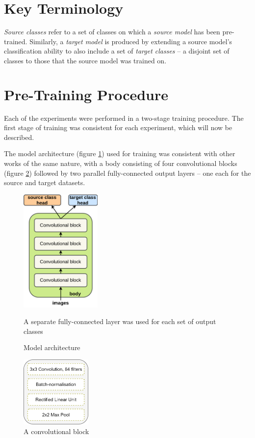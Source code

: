 \documentclass{report}
\begin{document}
	\section{Key Terminology}
	\textit{Source classes} refer to a set of classes on which a \textit{source model} has been pre-trained. Similarly, a \textit{target model} is produced by extending a source model's classification ability to also include a set of \textit{target classes} -- a disjoint set of classes to those that the source model was trained on. \par
	
	\section{Pre-Training Procedure} \label{pretrain}
	Each of the experiments were performed in a two-stage training procedure. The first stage of training was consistent for each experiment, which will now be described. \par
	The model architecture (figure \ref{fig:model:1}) used for training was consistent with other works of the same nature, with a body consisting of four convolutional blocks (figure \ref{fig:convblock:1}) followed by two parallel fully-connected output layers -- one each for the source and target datasets. \par
	\begin{figure}[h]
		\centering
		\includegraphics[width=4cm]{modelarchitecture}
		\caption{Model architecture}
		\label{fig:model:1}
		A separate fully-connected layer was used for each set of output classes
	\end{figure}
	\begin{figure}[h]
		\centering
		\includegraphics[width=3.5cm]{convblock}
		\caption{A convolutional block}
		\label{fig:convblock:1}
	\end{figure}
\end{document}
